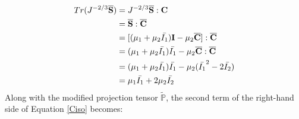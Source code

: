 \begin{equation}
\begin{split}
Tr(J^{-2/3}\overline{\bold{S}}) &= J^{-2/3}{\overline{\bold{S}}} : {\bold{C}} \\
&= \overline{\bold{S}} : \overline{\bold{C}} \\
&= [(\mu_1 + \mu_2{\bar{I_1}})\bold{I} - \mu_2{\overline{\bold{C}}}] : \overline{\bold{C}} \\
&= (\mu_1 + \mu_2\bar{I_1})\bar{I_1} - \mu_2{\overline{\bold{C}}} : {\overline{\bold{C}}} \\
&= (\mu_1 + \mu_2\bar{I_1})\bar{I_1} - \mu_2({\bar{I_1}}^2 - 2\bar{I_2}) \\
&= \mu_1\bar{I_1} + 2\mu_2\bar{I_2}
\end{split}
\end{equation}
Along with the modified projection tensor $\tilde{\mathbb{P}}$, the second term of the right-hand side of Equation \ref{Ciso} becomes:

